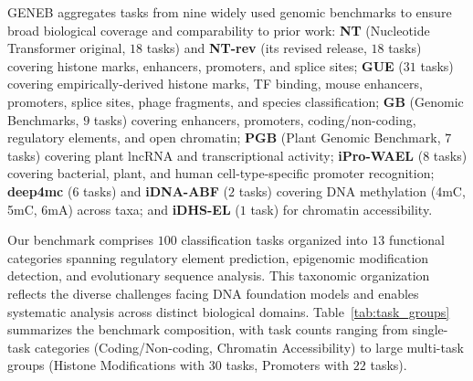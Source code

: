 \documentclass{llmxive}
\begin{document}
GENEB aggregates tasks from nine widely used genomic benchmarks
to ensure broad biological coverage and comparability to prior
work: \textbf{NT} (Nucleotide Transformer original, $18$ tasks)
and \textbf{NT-rev} (its revised release, $18$ tasks) covering
histone marks, enhancers, promoters, and splice sites;
\textbf{GUE} ($31$ tasks) covering empirically-derived histone
marks, TF binding, mouse enhancers, promoters, splice sites,
phage fragments, and species classification; \textbf{GB}
(Genomic Benchmarks, $9$ tasks) covering enhancers, promoters,
coding/non-coding, regulatory elements, and open chromatin;
\textbf{PGB} (Plant Genomic Benchmark, $7$ tasks) covering plant
lncRNA and transcriptional activity; \textbf{iPro-WAEL}
($8$ tasks) covering bacterial, plant, and human
cell-type-specific promoter recognition; \textbf{deep4mc}
($6$ tasks) and \textbf{iDNA-ABF} ($2$ tasks) covering DNA
methylation (4mC, 5mC, 6mA) across taxa; and \textbf{iDHS-EL}
($1$ task) for chromatin accessibility.

Our benchmark comprises $100$ classification tasks organized
into $13$ functional categories spanning regulatory element
prediction, epigenomic modification detection, and evolutionary
sequence analysis. This taxonomic organization reflects the
diverse challenges facing DNA foundation models and enables
systematic analysis across distinct biological domains.
Table~\ref{tab:task_groups} summarizes the benchmark composition,
with task counts ranging from single-task categories
(Coding/Non-coding, Chromatin Accessibility) to large multi-task
groups (Histone Modifications with $30$ tasks, Promoters with
$22$ tasks).
\end{document}
